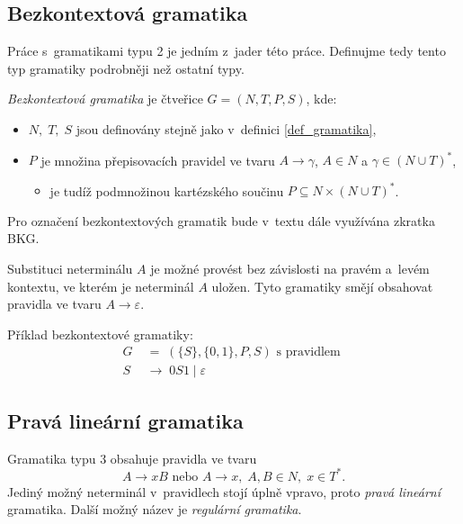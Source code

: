 \subsection*{Bezkontextová gramatika}
Práce s~gramatikami typu 2 je jedním z~jader této práce.
Definujme tedy tento typ gramatiky podrobněji než ostatní typy.
\begin{definition}\label{def_bkg}
    \emph{Bezkontextová gramatika} je čtveřice $G = (N, T, P, S)$, kde:
    \begin{itemize}
        \item $N,\; T,\; S$ jsou definovány stejně jako v~definici \ref{def_gramatika}, 
        \item $P$ je množina přepisovacích pravidel ve tvaru $A \rightarrow \gamma $, $A \in N$ a $\gamma \in (N \cup T)^*$,
        \begin{itemize}[label=$\circ$]
            \item je tudíž podmnožinou kartézského součinu $P \subseteq  N \times (N \cup T)^*$. 
        \end{itemize}
    \end{itemize}
\end{definition}

\begin{convention}
    Pro označení bezkontextových gramatik bude v~textu dále využívána zkratka BKG.
\end{convention}

Substituci neterminálu $A$ je možné provést bez závislosti na pravém a~levém kontextu, ve kterém je neterminál $A$ uložen.
Tyto gramatiky smějí obsahovat pravidla ve tvaru $A \rightarrow \varepsilon$.

\begin{example}
    Příklad bezkontextové gramatiky:
    \begin{align*}
        G \; &= \; (\{S\}, \{0, 1\}, P, S) \text{ s~pravidlem } \\
        S \; &\rightarrow \; 0S1 \; | \; \varepsilon
    \end{align*}
\end{example}

\subsection*{Pravá lineární gramatika}
Gramatika typu 3 obsahuje pravidla ve tvaru
\begin{equation*}
    A \rightarrow xB \text { nebo } A \rightarrow x,\; A, B \in N,\; x \in T^*.
\end{equation*}
Jediný možný neterminál v~pravidlech stojí úplně vpravo, proto \emph{pravá lineární} gramatika.
Další možný název je \emph{regulární gramatika}.

